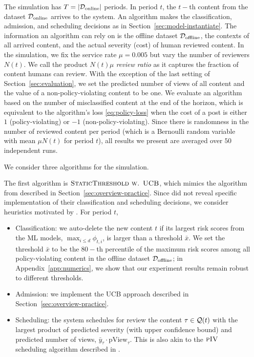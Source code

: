  The simulation has $T = |\mathcal{D}_{\text{online}}|$ periods. In period $t$, the $t-$th content from the dataset $\mathcal{D}_{\text{online}}$ arrives to the system. An algorithm makes the classification, admission, and scheduling decisions as in Section~\ref{sec:model-instantiate}. The information an algorithm can rely on is the offline dataset $\mathcal{D}_{\text{offline}}$, the contexts of all arrived content, and the actual severity (cost) of human reviewed content. In the simulation, we fix the service rate $\mu = 0.005$ but vary the number of reviewers $N(t).$ We call the product $N(t)\mu$ \emph{review ratio} as it captures the fraction of content humans can review. With the exception of the last setting of Section~\ref{sec:evaluation}, we set the predicted number of views of all content and the value of a non-policy-violating content to be one. We evaluate an algorithm based on the number of misclassified content at the end of the horizon, which is equivalent to the algorithm's loss \eqref{eq:policy-loss} when the cost of a post is either $1$ (policy-violating) or $-1$ (non-policy-violating). Since there is randomness in the number of reviewed content per period (which is a Bernoulli random variable with mean $\mu N(t)$ for period $t$), all results we present are averaged over $50$ independent runs.

 We consider three algorithms for the simulation.

The first algorithm is $\textsc{StaticThreshold w. UCB}$, which mimics the algorithm from \cite{Avadhanula2022} described in Section~\ref{sec:overview-practice}. Since \cite{Avadhanula2022} did not reveal specific implementation of their classification and scheduling decisions, we consider heuristics motivated by \cite{makhijani2021quest}. For period $t$,
\begin{itemize}
\item Classification: we auto-delete the new content $t$ if its largest risk scores from the ML models, $\max_{i \leq d} \phi_{t,i}$, is larger than a threshold $\bar{x}$. We set the threshold $\bar{x}$ to be the $80-$th percentile of the maximum risk scores among all policy-violating content in the offline dataset $\mathcal{D}_{\text{offline}}$; in Appendix~\ref{app:numerics}, we show that our experiment results remain robust to different thresholds.
\item Admission: we implement the UCB approach described in Section~\ref{sec:overview-practice}.
\item Scheduling: the system schedules for review the content $\tau \in \mathcal{Q}(t)$ with the largest product of predicted severity (with upper confidence bound) and predicted number of views, $\bar{y}_{\tau} \cdot \text{pView}_{\tau}.$ This is also akin to the $\textsc{pIV}$ scheduling algorithm described in \cite{gocmen2025scheduling}.
\end{itemize}

